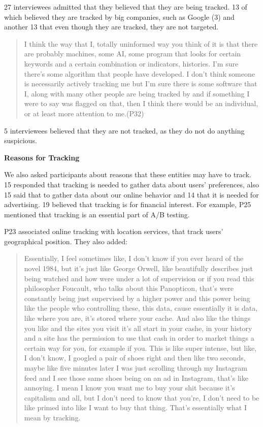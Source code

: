 27 interviewees admitted that they believed that they are being tracked. 13 of which believed they are tracked by big companies, such as Google (3) and another 13 that even though they are tracked, they are not targeted. 


\begin{quote}I think the way that I, totally uninformed way you think of it is that there are probably machines, some AI, some program that looks for certain keywords and a certain combination or indicators, histories. I'm sure there's some algorithm that people have developed. I don't think someone is necessarily actively tracking me but I'm sure there is some software that I, along with many other people are being tracked by and if something I were to say was flagged on that, then I think there would be an individual, or at least more attention to me.(P32)\end{quote}


5 interviewees believed that they are not tracked, as they do not do anything suspicious.

\textbf{Reasons for Tracking}    

We also asked participants about reasons that these entities may have to track. 15 responded that tracking is needed to gather data about users' preferences, also 15 said that to gather data about our online behavior and 14 that it is needed for advertising. 19 believed that tracking is for financial interest. For example, P25 mentioned that tracking is an essential part of A/B testing. 

P23 associated online tracking with location services, that track users' geographical position. They also added:

\begin{quote} 
Essentially, I feel sometimes like, I don't know if you ever heard of the novel 1984, but it's just like George Orwell, like beautifully describes just being watched and how were under a lot of supervision or if you read this philosopher Foucault, who talks about this Panopticon, that's were constantly being just supervised by a higher power and this power being like the people who controlling these, this data, cause essentially it is data, like where you are, it's stored where your cache. And also like the things you like and the sites you visit it's all start in your cashe, in your history and a site has the permission to use that cash in order to market things a certain way for you, for example if you. This is like super intense, but like, I don't know, I googled a pair of shoes right and then like two seconds, maybe like five minutes later I was just scrolling through my Instagram feed and I see those same shoes being on an ad in Instagram, that's like annoying. I mean I know you want me to buy your shit because it's capitalism and all, but I don't need to know that you're, I don't need to be like primed into like I want to buy that thing. That's essentially what I mean by tracking.\end{quote}

